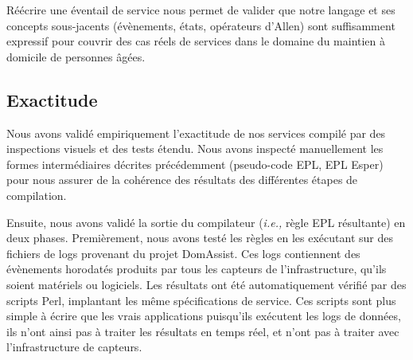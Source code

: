 Réécrire une éventail de service nous permet de valider que notre langage et ses concepts sous-jacents (évènements, états, opérateurs d'Allen) sont suffisamment expressif pour couvrir des cas réels de services dans le domaine du maintien à domicile de personnes âgées.

\subsection{Exactitude}\label{validation:results}

Nous avons validé empiriquement l'exactitude de nos services compilé par des inspections visuels et des tests étendu. Nous avons inspecté manuellement les formes intermédiaires décrites précédemment (pseudo-code EPL, EPL Esper) pour nous assurer de la cohérence des résultats des différentes étapes de compilation.

Ensuite, nous avons validé la sortie du compilateur ({\em i.e.,} règle EPL résultante) en deux phases. Premièrement, nous avons testé les règles en les exécutant sur des fichiers de logs provenant du projet DomAssist. Ces logs contiennent des évènements horodatés produits par tous les capteurs de l'infrastructure, qu'ils soient matériels ou logiciels. Les résultats ont été automatiquement vérifié par des scripts Perl, implantant les même spécifications de service. Ces scripts sont plus simple à écrire que les vrais applications puisqu'ils exécutent les logs de données, ils n'ont ainsi pas à traiter les résultats en temps réel, et n'ont pas à traiter avec l'infrastructure de capteurs.


